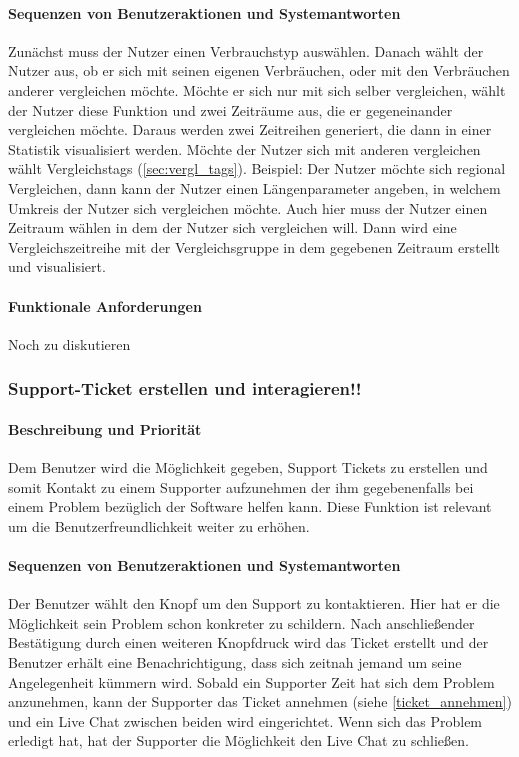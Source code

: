 \paragraph{Sequenzen von Benutzeraktionen und Systemantworten}
Zunächst muss der Nutzer einen Verbrauchstyp auswählen. Danach wählt der Nutzer aus, ob er sich mit seinen eigenen Verbräuchen, oder mit den Verbräuchen anderer vergleichen möchte. Möchte er sich nur mit sich selber vergleichen, wählt der Nutzer diese Funktion und zwei Zeiträume aus, die er gegeneinander vergleichen möchte. Daraus werden zwei Zeitreihen generiert, die dann in einer Statistik visualisiert werden. Möchte der Nutzer sich mit anderen vergleichen wählt  Vergleichstags (\ref{sec:vergl_tags}). Beispiel: Der Nutzer möchte sich regional Vergleichen, dann kann der Nutzer einen Längenparameter angeben, in welchem Umkreis der Nutzer sich vergleichen möchte. Auch hier muss der Nutzer einen Zeitraum wählen in dem der Nutzer sich vergleichen will. Dann wird eine Vergleichszeitreihe mit der Vergleichsgruppe in dem gegebenen Zeitraum erstellt und visualisiert.
\paragraph{Funktionale Anforderungen}
Noch zu diskutieren

\subsubsection{Support-Ticket erstellen und interagieren!!}
\paragraph{Beschreibung und Priorität}
Dem Benutzer wird die Möglichkeit gegeben, Support Tickets zu erstellen und somit Kontakt zu einem Supporter aufzunehmen der ihm gegebenenfalls bei einem Problem bezüglich der Software helfen kann. Diese Funktion ist relevant um die Benutzerfreundlichkeit weiter zu erhöhen.
\paragraph{Sequenzen von Benutzeraktionen und Systemantworten}
Der Benutzer wählt den Knopf um den Support zu kontaktieren. Hier hat er die Möglichkeit sein Problem schon konkreter zu schildern. Nach anschließender Bestätigung durch einen weiteren Knopfdruck wird das Ticket erstellt und der Benutzer erhält eine Benachrichtigung, dass sich zeitnah jemand um seine Angelegenheit kümmern wird. Sobald ein Supporter Zeit hat sich dem Problem anzunehmen, kann der Supporter das Ticket annehmen (siehe \ref{ticket_annehmen}) und ein Live Chat zwischen beiden wird eingerichtet. Wenn sich das Problem erledigt hat, hat der Supporter die Möglichkeit den Live Chat zu schließen.
